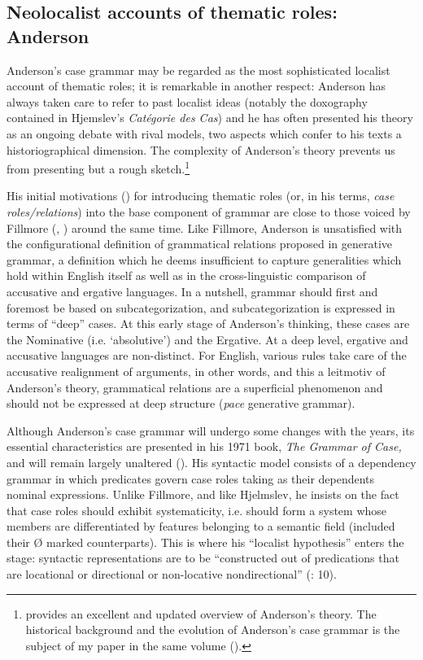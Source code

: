 \documentclass[output=paper]{langscibook}
\begin{document}
\subsection{Neolocalist accounts of thematic roles: Anderson}

Anderson’s case grammar may be regarded as the most sophisticated localist account of thematic roles; it is remarkable in another respect: Anderson has always taken care to refer to past localist ideas (notably the doxography contained in Hjemslev’s \textit{Catégorie des Cas}) and he has often presented his theory as an ongoing debate with rival models, two aspects which confer to his texts a historiographical dimension. The complexity of Anderson’s theory prevents us from presenting but a rough sketch.\footnote{\textrm{ \citet{bohm_investigating_2018} provides an excellent and updated overview of Anderson’s theory. The historical background and the evolution of Anderson’s case grammar is the subject of my paper in the same volume (\citealt{bohm_andersons_2018}).}}

His initial motivations (\citealt{anderson_ergative_1968}) for introducing thematic roles (or, in his terms, \textit{case roles\slash relations}) into the base component of grammar are close to those voiced by Fillmore (\citeyear{fillmore_toward_1966}, \citeyear{bach_case_1968}) around the same time. Like Fillmore, Anderson is unsatisfied with the configurational definition of grammatical relations proposed in generative grammar, a definition which he deems insufficient to capture generalities which hold within English itself as well as in the cross-linguistic comparison of accusative and ergative languages. In a nutshell, grammar should first and foremost be based on subcategorization, and subcategorization is expressed in terms of “deep” cases. At this early stage of Anderson’s thinking, these cases are the Nominative (i.e. ‘absolutive’) and the Ergative. At a deep level, ergative and accusative languages are non-distinct. For English, various rules take care of the accusative realignment of arguments, in other words, and this a leitmotiv of Anderson’s theory, grammatical relations are a superficial phenomenon and should not be expressed at deep structure (\textit{pace} generative grammar).

Although Anderson’s case grammar will undergo some changes with the years, its essential characteristics are presented in his 1971 book, \textit{The Grammar of Case, }and will remain largely unaltered\textit{ }(\citealt{bohm_andersons_2018}). His syntactic model consists of a dependency grammar in which predicates govern case roles taking as their dependents nominal expressions. Unlike Fillmore, and like Hjelmslev, he insists on the fact that case roles should exhibit systematicity, i.e. should form a system whose members are differentiated by features belonging to a semantic field (included their Ø marked counterparts). This is where his “localist hypothesis” enters the stage: syntactic representations are to be “constructed out of predications that are locational or directional or non-locative nondirectional” (\citealt{anderson_essay_1973}: 10).
\end{document}
